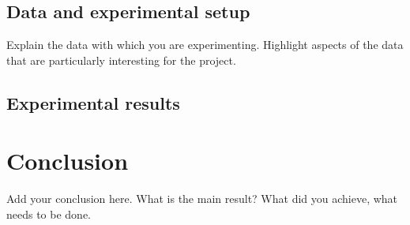 \documentclass[10pt]{article}
\theoremstyle{definition}
\begin{document}
\subsection{Data and experimental setup}

Explain the data with which you are experimenting.
Highlight aspects of the data that are particularly interesting 
for the project. 

\subsection{Experimental results}


\section{Conclusion}

Add your conclusion here. What is the main result? What did you achieve, what 
needs to be done. 
\end{document}
